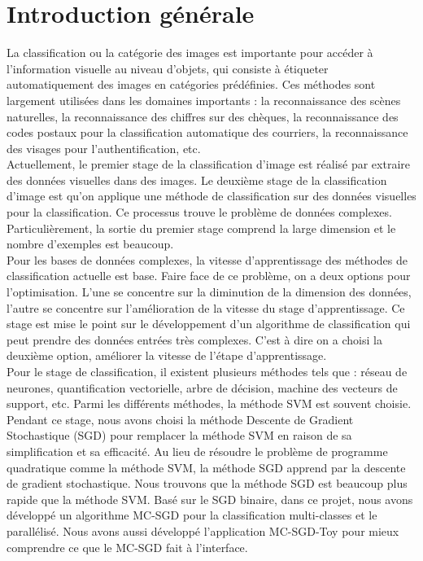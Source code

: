 \chapter*{Introduction générale}

La classification ou la catégorie des images est importante pour accéder à l'information visuelle au niveau d'objets, qui consiste à étiqueter automatiquement des images en catégories prédéfinies. Ces méthodes sont largement utilisées dans les domaines importants : la reconnaissance des scènes naturelles, la reconnaissance des chiffres sur des chèques, la reconnaissance des codes postaux pour la classification automatique des courriers, la reconnaissance des visages pour l'authentification, etc.\\

Actuellement, le premier stage de la classification d'image est réalisé par extraire des données visuelles dans des images. Le deuxième stage de la classification d'image est qu'on applique une méthode de classification sur des données visuelles pour la classification. Ce processus trouve le problème de données complexes. Particulièrement, la sortie du premier stage comprend la large dimension et le nombre d'exemples est beaucoup.\\

Pour les bases de données complexes, la vitesse d'apprentissage des méthodes de classification actuelle est base. Faire face de ce problème, on a deux options pour l'optimisation. L'une se concentre sur la diminution de la dimension des données, l'autre se concentre sur l'amélioration de la vitesse du stage d'apprentissage. Ce stage est mise le point sur le développement d'un algorithme de classification qui peut prendre des données entrées très complexes. C'est à dire on a choisi la deuxième option, améliorer la vitesse de l'étape d'apprentissage.\\

Pour le stage de classification, il existent plusieurs méthodes tels que : réseau de neurones, quantification vectorielle, arbre de décision, machine des vecteurs de support, etc. Parmi les différents méthodes, la méthode SVM est souvent choisie. Pendant ce stage, nous avons choisi la méthode Descente de Gradient Stochastique (SGD) pour remplacer la méthode SVM en raison de sa simplification et sa efficacité. Au lieu de résoudre le problème de programme quadratique comme la méthode SVM, la méthode SGD apprend par la descente de gradient stochastique. Nous trouvons que la méthode SGD est beaucoup plus rapide que la méthode SVM. Basé sur le SGD binaire, dans ce projet, nous avons développé un algorithme MC-SGD pour la classification multi-classes et le parallélisé. Nous avons aussi développé l'application MC-SGD-Toy pour mieux comprendre ce que le MC-SGD fait à l'interface.

